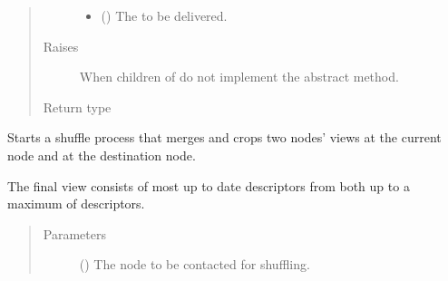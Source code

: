 \documentclass[letterpaper,10pt,english]{sphinxmanual}
\begin{document}
\begin{fulllineitems}
\begin{fulllineitems}
\begin{quote}
\begin{description}
\begin{itemize}
\item {} 
 ({\hyperref[\detokenize{app.domain.helpers:app.domain.helpers.smart_dataclasses.FileBlockData}]{}}) \textendash{} The {\hyperref[\detokenize{app.domain.helpers:app.domain.helpers.smart_dataclasses.FileBlockData}]{}}
to be delivered.

\end{itemize}

\item[{Raises}] \leavevmode
{} \textendash{} When children of  do not implement the abstract method.

\item[{Return type}] \leavevmode
{}

\end{description}\end{quote}

\end{fulllineitems}


\begin{fulllineitems}
\label{\detokenize{app.domain:app.domain.network_nodes.NewscastNode.shuffle}}
Starts a shuffle process that merges and crops two nodes’ views at
the current node and at the destination node.

The final view consists of most up to date descriptors from both
{\hyperref[\detokenize{app.domain:app.domain.network_nodes.NewscastNode.view}]{}} up to a maximum of 
descriptors.
\begin{quote}\begin{description}
\item[{Parameters}] \leavevmode
{} ({\hyperref[\detokenize{app.domain:app.domain.network_nodes.NewscastNode}]{}}) \textendash{} The node to be contacted for shuffling.


\end{description}
\end{quote}
\end{fulllineitems}
\end{fulllineitems}
\end{document}
